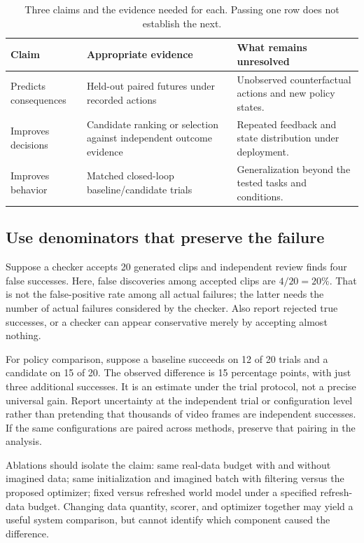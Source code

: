 \begin{table}[H]\centering\small
\caption{Three claims and the evidence needed for each. Passing one row does not establish the next.}
\begin{tabularx}{\linewidth}{@{}>{\raggedright\arraybackslash}p{27mm}YY@{}}\toprule
Claim & Appropriate evidence & What remains unresolved\\\midrule
Predicts consequences & Held-out paired futures under recorded actions & Unobserved counterfactual actions and new policy states.\\
Improves decisions & Candidate ranking or selection against independent outcome evidence & Repeated feedback and state distribution under deployment.\\
Improves behavior & Matched closed-loop baseline/candidate trials & Generalization beyond the tested tasks and conditions.\\\bottomrule
\end{tabularx}
\end{table}

\subsection{Use denominators that preserve the failure}
Suppose a checker accepts 20 generated clips and independent review finds four false successes. Here, false discoveries among accepted clips are $4/20=20\%$. That is not the false-positive rate among all actual failures; the latter needs the number of actual failures considered by the checker. Also report rejected true successes, or a checker can appear conservative merely by accepting almost nothing.

For policy comparison, suppose a baseline succeeds on 12 of 20 trials and a candidate on 15 of 20. The observed difference is 15 percentage points, with just three additional successes. It is an estimate under the trial protocol, not a precise universal gain. Report uncertainty at the independent trial or configuration level rather than pretending that thousands of video frames are independent successes. If the same configurations are paired across methods, preserve that pairing in the analysis.

Ablations should isolate the claim: same real-data budget with and without imagined data; same initialization and imagined batch with filtering versus the proposed optimizer; fixed versus refreshed world model under a specified refresh-data budget. Changing data quantity, scorer, and optimizer together may yield a useful system comparison, but cannot identify which component caused the difference.

